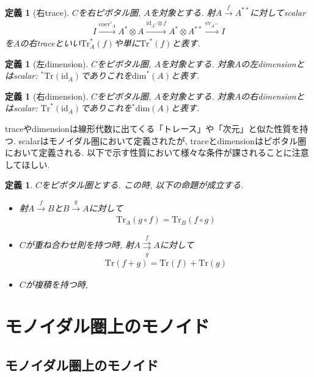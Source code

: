 \documentclass[a4paper,12pt]{ltjsarticle}
\theoremstyle{break}
\newtheorem{defn}[thm]{定義}
\newcommand{\xr}[1]{\xrightarrow{#1}}
\newcommand{\id}{\mathrm{id}}
\newcommand{\eva}{\mathrm{ev}}
\newcommand{\coev}{\mathrm{coev}}
\newcommand{\ci}{\circ}
\newcommand{\ot}{\otimes}
\newcommand{\tra}{\mathrm{Tr}}
\newcommand{\dime}{\mathrm{dim}}
\numberwithin{equation}{section}
\begin{document}
\begin{defn}[右trace]
  $C$を右ピボタル圏, $A$を対象とする. 
  射$A \xr{f} A^{**}$に対してscalar
  \begin{align*}
    I \xr{\coev'_A} A^* \ot A \xr{\id_{A^*} \ot f} A^* \ot A^{**} \xr{\eva_{A^{**}}} I
  \end{align*}  
    を$A$の右traceといい$\tra^*_A(f)$や単に$\tra^*(f)$と表す.  
\end{defn}

\begin{defn}[左dimension]%
  $C$をピボタル圏, $A$を対象とする. 
  対象$A$の左dimensionとはscalar: ${}^*\tra(\id_A)$でありこれを$\dime^*(A)$と表す. 
\end{defn}

\begin{defn}[右dimension]%
  $C$をピボタル圏, $A$を対象とする. 
  対象$A$の右dimensionとはscalar: $\tra^*(\id_A)$でありこれを${}^*\dime(A)$と表す. 
\end{defn}

traceやdimensionは線形代数に出てくる「トレース」や「次元」と似た性質を持つ. 
scalarはモノイダル圏において定義されたが, traceとdimensionはピボタル圏において定義される. 
以下で示す性質において様々な条件が課されることに注意してほしい. 

\begin{defn}
  $C$をピボタル圏とする. 
  この時, 以下の命題が成立する. 
  \begin{itemize}
    \item 射$A \xr{f} B$と$B \xr{g} A$に対して
    \begin{align*}
      \tra_A(g \ci f)=\tra_B(f \ci g)
    \end{align*}
    \item $C$が重ね合わせ則を持つ時, 射$A \overset{f}{\underset{g}{\rightrightarrows}} A$に対して
    \begin{align*}
      \tra(f+g)=\tra(f)+\tra(g)
    \end{align*}
    \item $C$が複積を持つ時, 
  \end{itemize}
\end{defn}

\newpage

\section{モノイダル圏上のモノイド}

\subsection{モノイダル圏上のモノイド}
\end{document}
